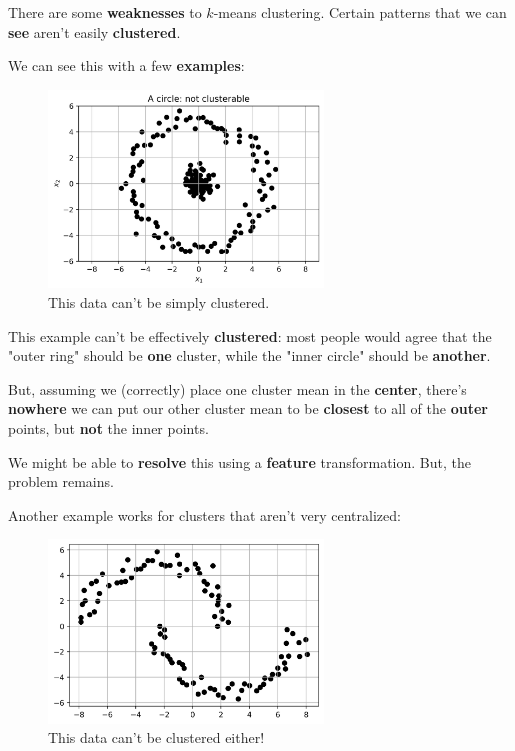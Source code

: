         There are some \textbf{weaknesses} to $k$-means clustering. Certain patterns that we can \textbf{see} aren't easily \textbf{clustered}.
        
        We can see this with a few \textbf{examples}:
        
        \begin{figure}[h]
            \centering
            \includegraphics[width=0.65\textwidth]{images/clustering_images/center_unclusterable.png}
            \caption*{This data can't be simply clustered.}
        \end{figure}
        
        This example can't be effectively \textbf{clustered}: most people would agree that the "outer ring" should be \textbf{one} cluster, while the "inner circle" should be \textbf{another}.
        
        But, assuming we (correctly) place one cluster mean in the \textbf{center}, there's \textbf{nowhere} we can put our other cluster mean to be \textbf{closest} to all of the \textbf{outer} points, but \textbf{not} the inner points.
        
        We might be able to \textbf{resolve} this using a \textbf{feature} transformation. But, the problem remains.
            
        Another example works for clusters that aren't very centralized:
        
        \begin{figure}[h]
            \centering
            \includegraphics[width=0.65\textwidth]{images/clustering_images/offset_unclusterable.png}
            \caption*{This data can't be clustered either!}
        \end{figure}
        
